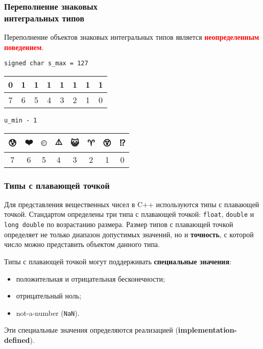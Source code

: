 \documentclass[compress, 8pt]{beamer}
\newenvironment{eightbit}{%
    \begin{center}
        \begin{tabular}{ |m{0.2cm}|m{0.2cm}|m{0.2cm}|m{0.2cm}|m{0.2cm}|m{0.2cm}|m{0.2cm}|m{0.2cm}|  }
            \hline
}{
        \hline
        \multicolumn{1}{c}{\color{gray}\tiny{7}} &
        \multicolumn{1}{c}{\color{gray}\tiny{6}} &
        \multicolumn{1}{c}{\color{gray}\tiny{5}} &
        \multicolumn{1}{c}{\color{gray}\tiny{4}} &
        \multicolumn{1}{c}{\color{gray}\tiny{3}} &
        \multicolumn{1}{c}{\color{gray}\tiny{2}} &
        \multicolumn{1}{c}{\color{gray}\tiny{1}} &
        \multicolumn{1}{c}{\color{gray}\tiny{0}} \\
        \end{tabular}
    \end{center}
}
\begin{document}
\begin{frame}[fragile]

    \frametitle{Переполнение знаковых \\ интегральных типов}

    Переполнение объектов знаковых интегральных типов является
    \textcolor{red}{\textbf{неопределенным поведением}}.

    \hfill \break

    \verb|signed char s_max = 127|

    \begin{eightbit}
        0 & 1 & 1 & 1 & 1 & 1 & 1 & 1 \\
    \end{eightbit}

    \verb|u_min - 1|

    \begin{eightbit}
         😰 & ❤️ & ©️ & ⚠️ & 😺 & ♈️ & 😵 & ⁉️ \\
    \end{eightbit}

\end{frame}

\begin{frame}[fragile]

    \frametitle{Типы с плавающей точкой}

    Для представления вещественных чисел в C++ используются
    типы с плавающей точкой.
    Стандартом определены три типа с плавающей точкой:
    \verb|float|, \verb|double| и \verb|long double|
    по возрастанию размера.
    Размер типов с плавающей точкой определяет не только
    диапазон допустимых значений, но и \textbf{точность},
    с которой число можно представить объектом данного
    типа.

    \hfill\break
    Типы с плавающей точкой могут поддерживать
    \textbf{специальные значения}:

    \begin{itemize}

        \item положительная и отрицательная бесконечности;

        \item отрицательный ноль;

        \item not-a-number (\verb|NaN|).

    \end{itemize}

    Эти специальные значения определяются реализацией
    (\textbf{implementation-defined}).

\end{frame}
\end{document}
